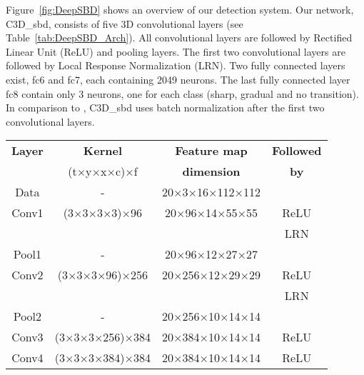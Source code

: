 \documentclass[journal]{IEEEtran}
\begin{document}
Figure~\ref{fig:DeepSBD} shows an overview of our detection system. Our network, C3D\_{sbd}, consists of five 3D convolutional layers (see Table~\ref{tab:DeepSBD_Arch}). All convolutional layers are followed by Rectified Linear Unit (ReLU) and pooling layers. The first two convolutional layers are followed by Local Response Normalization (LRN). Two fully connected layers exist, fc6 and fc7, each containing 2049 neurons. The last fully connected layer fc8 contain only 3 neurons, one for each class (sharp, gradual and no transition). In comparison to \cite{Tran15}, C3D\_{sbd} uses batch normalization after the first two convolutional layers. 


\begin{table}
\small
\begin{tabular}{|c|c|c|c|}
\hline
\textbf{Layer}   & \textbf{Kernel} & \textbf{Feature map} & \textbf{Followed} \\ 
                 & (t$\times$y$\times$x$\times$c)$\times$f             &    \textbf{dimension}  & \textbf{    by   }                      \\ \hline
Data    & -                           & 20$\times$3$\times$16$\times$112$\times$112                 &                     \\ \hline
Conv1   & (3$\times$3$\times$3$\times$3)$\times$96                & 20$\times$96$\times$14$\times$55$\times$55                  & ReLU                \\ 
        &                             &                                 & LRN                 \\ \hline
Pool1   & -                           & 20$\times$96$\times$12$\times$27$\times$27                  &                     \\ \hline
Conv2   & (3$\times$3$\times$3$\times$96)$\times$256              & 20$\times$256$\times$12$\times$29$\times$29                 & ReLU                \\ 
        &                             &                                 & LRN                 \\ \hline
Pool2   & -                           & 20$\times$256$\times$10$\times$14$\times$14                 &                     \\ \hline
Conv3   & (3$\times$3$\times$3$\times$256)$\times$384             & 20$\times$384$\times$10$\times$14$\times$14                 & ReLU                \\ \hline
Conv4   & (3$\times$3$\times$3$\times$384)$\times$384             & 20$\times$384$\times$10$\times$14$\times$14                 & ReLU                \\ \hline

\end{tabular}
\end{table}
\end{document}
